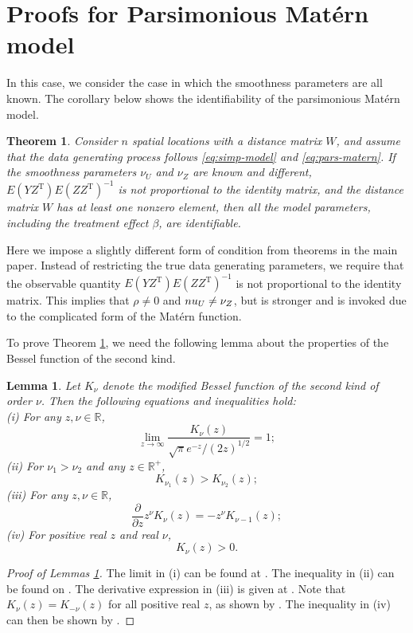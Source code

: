 \documentclass[11pt]{article}
\newtheorem{theorem}{Theorem}
\newtheorem{lemma}{Lemma}
\theoremstyle{definition}
\theoremstyle{remark}
\def\top{{ \mathrm{\scriptscriptstyle T} }}
\begin{document}
\section{Proofs for Parsimonious Mat\'ern model}\label{sec:proofs-matern}


In this case, we consider the case in which the smoothness parameters are all known. 
The corollary below shows the identifiability of the parsimonious Mat\'ern model. 

\begin{theorem}\label{cor:bivariate-matern-id-known-smoothness}
Consider $n$ spatial locations with a distance matrix $W$, and assume that the data generating process follows \eqref{eq:simp-model} and \eqref{eq:pars-matern}.
If the smoothness parameters $\nu_U$ and $\nu_Z$ are known and different, $E(YZ^\top)E(ZZ^\top)^{-1}$ is not proportional to the identity matrix, and the distance matrix $W$ has at least one nonzero element, then 
all the model parameters, including the treatment effect $\beta$,
are identifiable.
\end{theorem}
Here we impose a slightly different form of condition from theorems in the main paper. 
Instead of restricting the true data generating parameters, we require that the observable quantity $E(YZ^\top)E(ZZ^\top)^{-1}$ is not proportional to the identity matrix. This implies that $\rho\neq 0$ and $\\nu_U\neq \nu_Z$, but is stronger and is invoked due to the complicated form of the Mat\'ern function.


To prove Theorem \ref{cor:bivariate-matern-id-known-smoothness}, we need the following lemma about the properties of the Bessel function of the second kind.

\begin{lemma}\label{lem:bessel-properties}
Let $K_\nu$ denote the modified Bessel function of the second kind of order $\nu$. Then the following equations and inequalities hold:\\
(i) For any $z, \nu \in \mathbb{R}$,
\[\lim_{z\to\infty} \frac{K_\nu(z)}{\sqrt{\pi} e^{-z}/(2z)^{1/2}} = 1;\]
(ii) For $\nu_1 > \nu_2$ and any $z \in \mathbb{R}^+$, \[K_{\nu_1}(z) > K_{\nu_2}(z);\]
(iii) For any $z, \nu \in \mathbb{R}$, \[\frac{\partial}{\partial z} z^\nu K_\nu(z) = -z^\nu K_{\nu-1}(z);\]
(iv) For positive real $z$ and real $\nu$, \[K_\nu(z) > 0.\]


\end{lemma}

\begin{proof}[Proof of Lemmas \ref{lem:bessel-properties}]
The limit in (i) can be found at \cite[\href{https://dlmf.nist.gov/10.25\#E3}{(10.25.3)}]{NIST:DLMF}. The inequality in (ii) can be found on \cite[\href{https://dlmf.nist.gov/10.37\#E1}{(10.37)}]{NIST:DLMF}. The derivative expression in (iii) is given at \cite[\href{https://dlmf.nist.gov/10.29\#E4}{(10.29.4)}]{NIST:DLMF}. 
Note that $K_\nu(z) = K_{-\nu}(z)$ for all positive real $z$, as shown by \cite[\href{https://dlmf.nist.gov/10.27\#E3}{Section 10.27}]{NIST:DLMF}. 
The inequality in (iv) can then be shown by  \cite[\href{https://dlmf.nist.gov/10.37}{Section 10.37}]{NIST:DLMF}. 
\end{proof}
\end{document}
